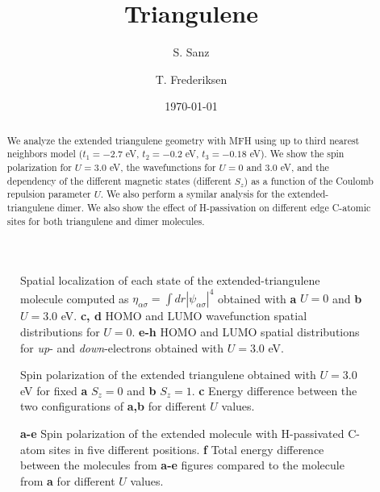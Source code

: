 \documentclass[twocolumn,amsmath,%
amssymb,prb,superscriptaddress]{revtex4}
\begin{document}
\title{Triangulene}

\author{S. Sanz}

\author{T. Frederiksen}

\date{\today}

\begin{abstract}
We analyze the extended triangulene geometry with MFH using up to third nearest neighbors model ($t_{1}=-2.7$ eV, $t_{2}=-0.2$ eV, $t_{3}=-0.18$ eV). We show the spin polarization for $ U=3.0$ eV, the wavefunctions for $U=0$ and $3.0$ eV, and the dependency of the different magnetic states (different $S_{z}$) as a function of the Coulomb repulsion parameter $U$. We also perform a symilar analysis for the extended-triangulene dimer. We also show the effect of H-passivation on different edge C-atomic sites for both triangulene and dimer molecules.
\end{abstract}

\maketitle



\begin{figure*}
	\scalebox{.7}{}
	\caption{Spatial localization of each state of the extended-triangulene molecule computed as $\eta_{\alpha\sigma}=\int dr|\psi_{\alpha\sigma}|^{4}$ obtained with \textbf{a} $U=0$ and \textbf{b} $U=3.0$ eV. \textbf{c, d} HOMO and LUMO wavefunction spatial distributions for $U=0$. \textbf{e-h} HOMO and LUMO spatial distributions for \emph{up}- and \emph{down}-electrons obtained with $U=3.0$ eV.}
\end{figure*}

\begin{figure*}
	\scalebox{.5}{}
	\caption{Spin polarization of the extended triangulene obtained with $U=3.0$ eV for fixed \textbf{a} $S_{z}=0$ and \textbf{b} $S_{z}=1$. \textbf{c} Energy difference between the two configurations of \textbf{a,b} for different $U$ values.}
\end{figure*}

\begin{figure*}
	\scalebox{.5}{}
	\caption{\textbf{a-e} Spin polarization of the extended molecule with H-passivated C-atom sites in five different positions. \textbf{f} Total energy difference between the molecules from \textbf{a-e} figures compared to the molecule from \textbf{a} for different $U$ values.}
\end{figure*}
\end{document}
